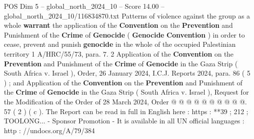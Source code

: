 \begin{textsample}{POS Dim 5 – global\_north\_2024\_10 – Score 14.00 – global\_north\_2024\_10/116834870.txt}
Patterns of violence against the group as a whole \textbf{warrant} the application of the \textbf{Convention} on the \textbf{Prevention} and Punishment of the \textbf{Crime} of \textbf{Genocide} ( \textbf{Genocide} \textbf{Convention} ) in order to cease, prevent and punish \textbf{genocide} in the whole of the occupied Palestinian territory 1 A/HRC/55/73, para. 7. 2 Application of the \textbf{Convention} on the \textbf{Prevention} and Punishment of the \textbf{Crime} of \textbf{Genocide} in the Gaza Strip ( South Africa v.
Israel ), Order, 26 January 2024, I.C.J.
Reports 2024, para. 86 ( 5 ) ; and Application of the \textbf{Convention} on the \textbf{Prevention} and Punishment of the \textbf{Crime} of \textbf{Genocide} in the Gaza Strip ( South Africa v.
Israel ), Request for the Modification of the Order of 28 March 2024, Order @ @ @ @ @ @ @ @ @ @. 57 ( 2 ) ( c ).
The Report can be read in full in English here : https : **39 ; 212 ; TOOLONG... - Sponsor Promotion - It is available in all UN official languages : http : //undocs.org/A/79/384

\end{textsample}
